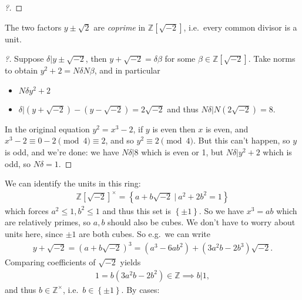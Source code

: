 \begin{example}[Fermat]
\begin{proof}[?]
\end{proof}

\begin{claim}

The two factors \(y \pm \sqrt 2\) are \emph{coprime} in
\({\mathbb{Z}}[\sqrt{-2}]\), i.e.~every common divisor is a unit.

\end{claim}

\begin{proof}[?]

Suppose \(\delta\mathrel{\Big|}y\pm \sqrt{-2}\), then
\(y + \sqrt{-2} = \delta \beta\) for some
\(\beta\in {\mathbb{Z}}[\sqrt{-2}]\). Take norms to obtain
\(y^2 + 2 = N \delta N \beta\), and in particular

\begin{itemize}
\tightlist
\item
  \(N \delta y^2 +2\)
\item
  \(\delta \mathrel{\Big|}(y+ \sqrt{-2} ) - (y - \sqrt{-2} ) = 2 \sqrt{-2}\)
  and thus \(N \delta \mathrel{\Big|}N(2 \sqrt{-2} ) = 8\).
\end{itemize}

In the original equation \(y^2 = x^3-2\), if \(y\) is even then \(x\) is
even, and \(x^3 - 2 \equiv 0-2 \pmod 4 \equiv 2\), and so
\(y^2 \equiv 2 \pmod 4\). But this can't happen, so \(y\) is odd, and
we're done: we have \(N \delta\mathrel{\Big|}8\) which is even or 1, but
\(N \delta\mathrel{\Big|}y^2 +2\) which is odd, so \(N \delta = 1\).

\end{proof}

We can identify the units in this ring:
\begin{align*}
{\mathbb{Z}}[\sqrt{-2} ]^{\times}= \left\{{ a + b \sqrt{-2} {~\mathrel{\Big|}~}a^2 + 2b^2 = 1}\right\}
\end{align*}
which forces \(a^2 \leq 1, b^2 \leq 1\) and thus this set is
\(\left\{{\pm 1}\right\}\). So we have \(x^3 = ab\) which are relatively
primes, so \(a,b\) should also be cubes. We don't have to worry about
units here, since \(\pm 1\) are both cubes. So e.g.~we can write
\begin{align*}
y + \sqrt{-2} = (a + b \sqrt{-2} )^3 = (a^3-6ab^2) + (3a^2b -2b^3) \sqrt{-2}
.\end{align*}
Comparing coefficients of \(\sqrt{-2}\) yields
\begin{align*} 1 = b(3a^2b - 2b^2) \in {\mathbb{Z}}\implies b \mathrel{\Big|}1
,\end{align*}
and thus \(b\in {\mathbb{Z}}^{\times}\),
i.e.~\(b\in \left\{{\pm 1}\right\}\). By cases:


\end{example}

